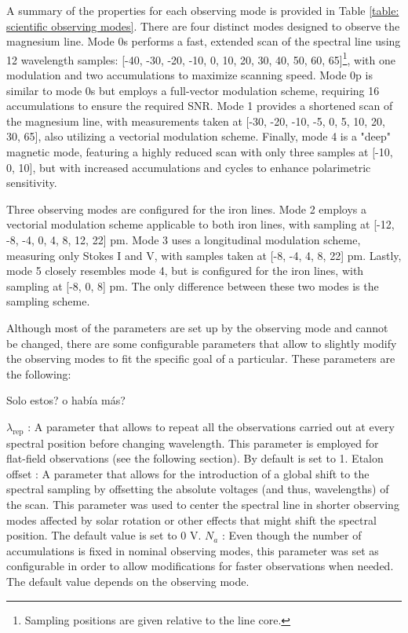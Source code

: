 A summary of the properties for each observing mode is provided in Table \ref{table: scientific observing modes}. There are four distinct modes designed to observe the magnesium line. Mode 0s performs a fast, extended scan of the spectral line using 12 wavelength samples: [-40, -30, -20, -10, 0, 10, 20, 30, 40, 50, 60, 65]\footnote{Sampling positions are given relative to the line core.}, with one modulation and two accumulations to maximize scanning speed. Mode 0p is similar to mode 0s but employs a full-vector modulation scheme, requiring 16 accumulations to ensure the required SNR. Mode 1 provides a shortened scan of the magnesium line, with measurements taken at [-30, -20, -10, -5, 0, 5, 10, 20, 30, 65], also utilizing a vectorial modulation scheme. Finally, mode 4 is a "deep" magnetic mode, featuring a highly reduced scan with only three samples at [-10, 0, 10], but with increased accumulations and cycles to enhance polarimetric sensitivity. 

Three observing modes are configured for the iron lines. Mode 2 employs a vectorial modulation scheme applicable to both iron lines, with sampling at [-12, -8, -4, 0, 4, 8, 12, 22] pm. Mode 3 uses a longitudinal modulation scheme, measuring only Stokes I and V, with samples taken at [-8, -4, 4, 8, 22] pm. Lastly, mode 5 closely resembles mode 4, but is configured for the iron lines, with sampling at [-8, 0, 8] pm. The only difference between these two modes is the sampling scheme.

Although most of the parameters are set up by the observing mode and cannot be changed, there are some configurable parameters that allow to slightly modify the observing modes to fit the specific goal of a particular. These parameters are the following:

Solo estos? o había más? 
\begin{itemize}
    \Myitem $\lambda _ {\text{rep}}$ : A parameter that allows to repeat all the observations carried out at every spectral position before changing wavelength. This parameter is employed for flat-field observations (see the following section). By default is set to 1.
    \Myitem Etalon offset : A parameter that allows for the introduction of a global shift to the spectral sampling by offsetting the absolute voltages (and thus, wavelengths) of the scan. This parameter was used to center the spectral line in shorter observing modes affected by solar rotation or other effects that might shift the spectral position. The default value is set to 0 V.
    \Myitem $N_a$ : Even though the number of accumulations is fixed in nominal observing modes, this parameter was set as configurable in order to allow modifications for faster observations when needed. The  default value depends on the observing mode.  
\end{itemize}

